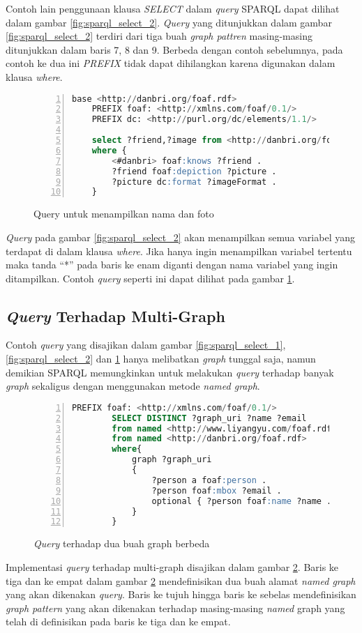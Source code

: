 Contoh lain penggunaan klausa \emph{SELECT} dalam \emph{query} SPARQL dapat dilihat dalam gambar \ref{fig:sparql_select_2}. \emph{Query} yang ditunjukkan dalam gambar \ref{fig:sparql_select_2} terdiri dari tiga buah \emph{graph pattren} masing-masing ditunjukkan dalam baris 7, 8 dan 9. Berbeda dengan contoh sebelumnya, pada contoh ke dua ini \emph{PREFIX} tidak dapat dihilangkan karena digunakan dalam klausa \emph{where}. 

\begin{figure}[hb]
	\centering
	\begin{lstlisting}[language=SQL,numbers=left]
	base <http://danbri.org/foaf.rdf>
	PREFIX foaf: <http://xmlns.com/foaf/0.1/>
	PREFIX dc: <http://purl.org/dc/elements/1.1/>

	select ?friend,?image from <http://danbri.org/foaf.rdf>
	where {
		<#danbri> foaf:knows ?friend .
		?friend foaf:depiction ?picture .
		?picture dc:format ?imageFormat .
	}\end{lstlisting}
	\caption{Query untuk menampilkan nama dan foto}
	\label{fig:sparql_select_3}
\end{figure}

\emph{Query} pada gambar \ref{fig:sparql_select_2} akan menampilkan semua variabel yang terdapat di dalam klausa \emph{where}. Jika hanya ingin menampilkan variabel tertentu maka tanda ``*'' pada baris ke enam diganti dengan nama variabel yang ingin ditampilkan. Contoh \emph{query} seperti ini dapat dilihat pada gambar \ref{fig:sparql_select_3}.

\subsection{\emph{Query} Terhadap Multi-Graph}
Contoh \emph{query} yang disajikan dalam gambar \ref{fig:sparql_select_1}, \ref{fig:sparql_select_2} dan \ref{fig:sparql_select_3} hanya melibatkan \emph{graph} tunggal saja, namun demikian SPARQL memungkinkan untuk melakukan \emph{query} terhadap banyak \emph{graph} sekaligus dengan menggunakan metode \emph{named graph}.

\begin{figure}[ht]
	\centering
	\begin{lstlisting}[language=SQL, numbers=left]
		PREFIX foaf: <http://xmlns.com/foaf/0.1/>
		SELECT DISTINCT ?graph_uri ?name ?email
		from named <http://www.liyangyu.com/foaf.rdf>
		from named <http://danbri.org/foaf.rdf>
		where{
			graph ?graph_uri
			{
				?person a foaf:person .
				?person foaf:mbox ?email .
				optional { ?person foaf:name ?name .}
			}
		}
	\end{lstlisting}
	\caption{\emph{Query} terhadap dua buah graph berbeda \citep{liyang_yu}}
	\label{fig:multi_graph_query}
\end{figure}

Implementasi \emph{query} terhadap multi-graph disajikan dalam gambar \ref{fig:multi_graph_query}. Baris ke tiga dan ke empat dalam gambar \ref{fig:multi_graph_query} mendefinisikan dua buah alamat \emph{named graph} yang akan dikenakan \emph{query}. Baris ke tujuh hingga baris ke sebelas mendefinisikan \emph{graph pattern} yang akan dikenakan terhadap masing-masing \emph{named} graph yang telah di definisikan pada baris ke tiga dan ke empat.